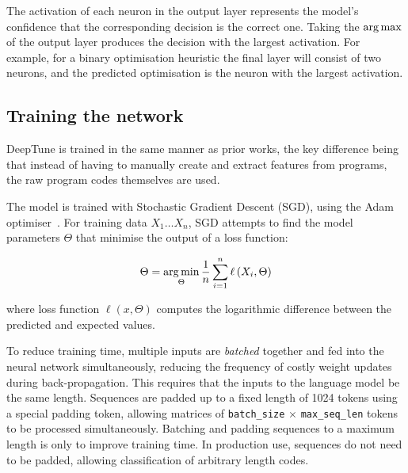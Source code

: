 The activation of each neuron in the output layer represents the model's confidence that the corresponding decision is the correct one. Taking the $\operatorname*{arg\,max}$ of the output layer produces the decision with the largest activation. For example, for a binary optimisation heuristic the final layer will consist of two neurons, and the predicted optimisation is the neuron with the largest activation.


\subsection{Training the network}

DeepTune is trained in the same manner as prior works, the key difference being that instead of having to manually create and extract features from programs, the raw program codes themselves are used.

The model is trained with Stochastic Gradient Descent (SGD), using the Adam optimiser~\cite{Kingma2015}. For training data $X_1 \ldots X_n$, SGD attempts to find the model parameters $\Theta$ that minimise the output of a loss function:

\begin{equation}
\Theta = \operatorname*{arg\,min}_{\Theta} \frac{1}{n} \sum_{i=1}^{n} \ell \left(X_i, \Theta \right)
\end{equation}

where loss function $\ell \left(x, \Theta \right)$ computes the logarithmic difference between the predicted and expected values.

To reduce training time, multiple inputs are \emph{batched} together and fed into the neural network simultaneously, reducing the frequency of costly weight updates during back-propagation. This requires that the inputs to the language model be the same length. Sequences are padded up to a fixed length of 1024 tokens using a special padding token, allowing matrices of \texttt{batch\_size} $\times$ \texttt{max\_seq\_len} tokens to be processed simultaneously. Batching and padding sequences to a maximum length is only to improve training time. In production use, sequences do not need to be padded, allowing classification of arbitrary length codes.
